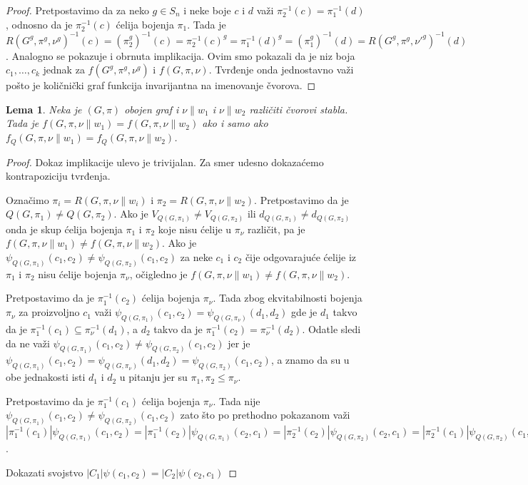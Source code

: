 \documentclass[12pt,oneside]{memoir}
\newtheorem{lemma}{Lema}
\theoremstyle{definition}
\begin{document}
  \begin{proof}
	  Pretpostavimo da za neko $g \in S_n$ i neke boje $c$ i $d$ važi
	  $\pi_2^{-1}(c) = \pi_1^{-1}(d)$, odnosno da je $\pi_2^{-1}(c)$ ćelija
	  bojenja $\pi_1$.  Tada je $R(G^g, \pi^g, \nu^g)^{-1}(c) =
	  (\pi_2^g)^{-1}(c) = \pi_2^{-1}(c)^g = \pi_1^{-1}(d)^g = (\pi_1^g)^{-1}(d)
	  = R(G^g, \pi^g, \nu'^g)^{-1}(d)$. Analogno se pokazuje i obrnuta
	  implikacija.  Ovim smo pokazali da je niz boja $c_1, \dots, c_k$ jednak
	  za $f(G^g, \pi^g, \nu^g)$ i $f(G, \pi, \nu)$. Tvrđenje onda jednostavno
	  važi pošto je količnički graf funkcija invarijantna na imenovanje
	  čvorova.
  \end{proof}

  \begin{lemma}
	  Neka je $(G, \pi)$ obojen graf i $\nu \| w_1$ i $\nu \| w_2$ različiti
	  čvorovi stabla. Tada je $f(G, \pi, \nu \| w_1) = f(G, \pi, \nu \| w_2)$
	  ako i samo ako $f_Q(G, \pi, \nu \| w_1) = f_Q(G, \pi, \nu \| w_2)$.
  \end{lemma}
  
  \begin{proof}
	  Dokaz implikacije ulevo je trivijalan. Za smer udesno dokazaćemo
	  kontrapoziciju tvrđenja.

	  Označimo $\pi_i = R(G, \pi, \nu \| w_i)$ i $\pi_2 = R(G, \pi, \nu \|
	  w_2)$. Pretpostavimo da je $Q(G, \pi_1) \neq Q(G, \pi_2)$. Ako je
	  $V_{Q(G, \pi_1)} \neq V_{Q(G, \pi_2)}$ ili $d_{Q(G, \pi_1)} \neq d_{Q(G,
	  \pi_2)}$ onda je skup ćelija bojenja $\pi_1$ i $\pi_2$ koje nisu ćelije u
	  $\pi_\nu$ različit, pa je $f(G, \pi, \nu \| w_1) \neq f(G, \pi, \nu \|
	  w_2)$. Ako je $\psi_{Q(G, \pi_1)}(c_1, c_2) \neq \psi_{Q(G, \pi_2)}(c_1,
	  c_2)$ za neke $c_1$ i $c_2$ čije odgovarajuće ćelije iz $\pi_1$ i $\pi_2$
	  nisu ćelije bojenja $\pi_\nu$, očigledno je $f(G, \pi, \nu \| w_1) \neq
	  f(G, \pi, \nu \| w_2)$.

	  Pretpostavimo da je $\pi_1^{-1}(c_2)$ ćelija bojenja $\pi_\nu$. Tada zbog
	  ekvitabilnosti bojenja $\pi_\nu$ za proizvoljno $c_1$ važi $\psi_{Q(G,
	  \pi_1)}(c_1, c_2) = \psi_{Q(G, \pi_\nu)}(d_1, d_2)$ gde je $d_1$ takvo da
	  je $\pi_1^{-1}(c_1) \subseteq \pi_\nu^{-1}(d_1)$, a $d_2$ takvo da je
	  $\pi_1^{-1}(c_2) = \pi_\nu^{-1}(d_2)$. Odatle sledi da ne važi
	  $\psi_{Q(G, \pi_1)}(c_1, c_2) \neq \psi_{Q(G, \pi_2)}(c_1, c_2)$ jer je
	  $\psi_{Q(G, \pi_1)}(c_1, c_2) = \psi_{Q(G, \pi_\nu)}(d_1, d_2) =
	  \psi_{Q(G, \pi_2)}(c_1, c_2)$, a znamo da su u obe jednakosti isti $d_1$
	  i $d_2$ u pitanju jer su $\pi_1, \pi_2 \leq \pi_\nu$.

	  Pretpostavimo da je $\pi_1^{-1}(c_1)$ ćelija bojenja $\pi_\nu$. Tada nije
	  $\psi_{Q(G, \pi_1)}(c_1, c_2) \neq \psi_{Q(G, \pi_2)}(c_1, c_2)$ zato što
	  po prethodno pokazanom važi $|\pi_1^{-1}(c_1)|\psi_{Q(G, \pi_1)}(c_1,
	  c_2) = |\pi_1^{-1}(c_2)|\psi_{Q(G, \pi_1)}(c_2, c_1) =
	  |\pi_2^{-1}(c_2)|\psi_{Q(G, \pi_2)}(c_2, c_1) =
	  |\pi_2^{-1}(c_1)|\psi_{Q(G, \pi_2)}(c_1, c_2)$.

	  {\color{red} Dokazati svojstvo $|C_1|\psi(c_1, c_2) = |C_2|\psi(c_2, c_1)$}
  \end{proof}
\end{document}
